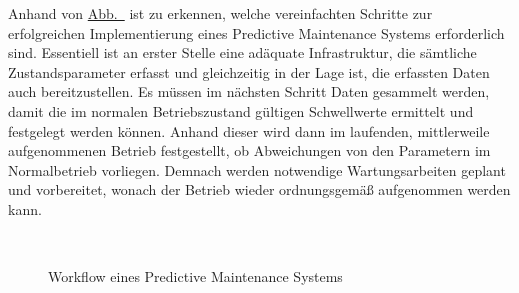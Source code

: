Anhand von \hyperref[fig:pdm_workflow]{Abb.~} ist zu erkennen, welche vereinfachten Schritte zur erfolgreichen
Implementierung eines Predictive Maintenance Systems erforderlich sind. Essentiell ist an erster Stelle eine adäquate Infrastruktur, die
sämtliche Zustandsparameter erfasst und gleichzeitig in der Lage ist, die erfassten Daten auch bereitzustellen. Es müssen im nächsten
Schritt Daten gesammelt werden, damit die im normalen Betriebszustand gültigen Schwellwerte ermittelt und festgelegt werden können.
Anhand dieser wird dann im laufenden, mittlerweile aufgenommenen Betrieb festgestellt, ob Abweichungen von den Parametern im Normalbetrieb
vorliegen. Demnach werden notwendige Wartungsarbeiten geplant und vorbereitet, wonach der Betrieb wieder ordnungsgemäß aufgenommen werden
kann.

\begin{figure}[H]
    \centering
    \caption{Workflow eines Predictive Maintenance Systems}
~\label{fig:pdm_workflow}
\end{figure}

